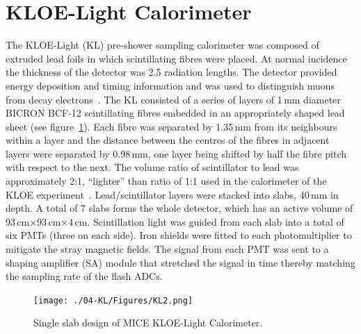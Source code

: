 \graphicspath{ {04-KL/Figures/} }

\section{KLOE-Light Calorimeter}
\label{Sect:KL}

The KLOE-Light (KL) pre-shower sampling calorimeter was composed of
extruded lead foils in which scintillating fibres were placed.
At normal incidence the thickness of the detector was 2.5 radiation
lengths.
The detector provided energy deposition and timing information and was
used to distinguish muons from decay
electrons~\cite{2016JInst..11P3001A}.
The KL consisted of a series of layers of 1\,mm diameter BICRON BCF-12
scintillating fibres embedded in an appropriately shaped lead sheet
(see figure~\ref{fig:KL2}).
Each fibre was separated by 1.35\,mm from its neighbours within a
layer and the distance between the centres of the fibres in adjacent
layers were separated by 0.98\,mm, one layer being shifted by half the
fibre pitch with respect to the next.
The volume ratio of scintillator to lead was approximately 2:1,
``lighter'' than ratio of 1:1 used in the calorimeter of the KLOE
experiment~\cite{Ambrosino:2009zza}. 
Lead/scintillator layers were stacked into slabs, 40\,mm in depth.
A total of 7 slabs forms the whole detector, which has an active
volume of 93\,cm$\times$93\,cm$\times$4\,cm.
Scintillation light was guided from each slab into a total of six PMTs
(three on each side).
Iron shields were fitted to each photomultiplier to mitigate the
stray magnetic fields.
The signal from each PMT was sent to a shaping amplifier (SA) module
that stretched the signal in time thereby matching the sampling rate
of the flash ADCs. \\
\begin{figure}
  \begin{center}
    \texttt{[image: ./04-KL/Figures/KL2.png]}
    \caption{Single slab design of MICE KLOE-Light Calorimeter.}
    \label{fig:KL2}
  \end{center}
\end{figure}

